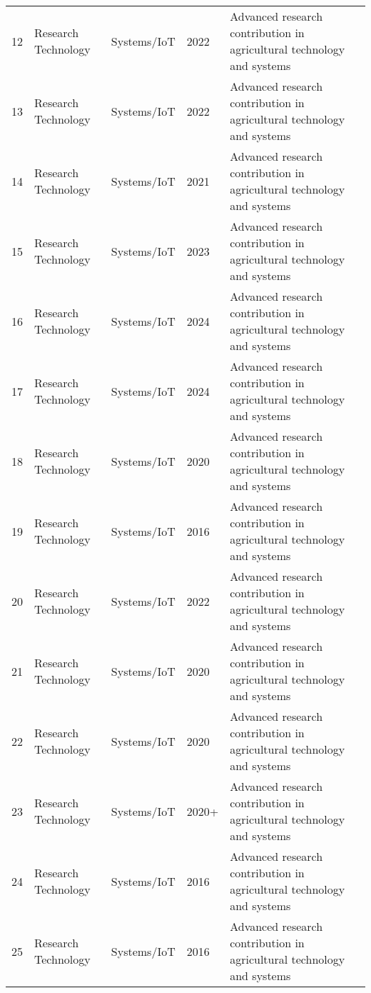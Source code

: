 \begin{table*}[htbp]
\begin{tabular}{p{}p{}p{}p{}p{}p{}}
 12 & Research Technology & Systems/IoT & 2022 & Advanced research contribution in agricultural technology and systems & \cite{Song2022} \\
 13 & Research Technology & Systems/IoT & 2022 & Advanced research contribution in agricultural technology and systems & \cite{sozzi2022automatic} \\
 14 & Research Technology & Systems/IoT & 2021 & Advanced research contribution in agricultural technology and systems & \cite{sumesh2021integration} \\
 15 & Research Technology & Systems/IoT & 2023 & Advanced research contribution in agricultural technology and systems & \cite{tang2023fruit} \\
 16 & Research Technology & Systems/IoT & 2024 & Advanced research contribution in agricultural technology and systems & \cite{Ting:2024_aej} \\
 17 & Research Technology & Systems/IoT & 2024 & Advanced research contribution in agricultural technology and systems & \cite{Ting:2024_ieee} \\
 18 & Research Technology & Systems/IoT & 2020 & Advanced research contribution in agricultural technology and systems & \cite{tu2020passion} \\
 19 & Research Technology & Systems/IoT & 2016 & Advanced research contribution in agricultural technology and systems & \cite{underwood2016mapping} \\
 20 & Research Technology & Systems/IoT & 2022 & Advanced research contribution in agricultural technology and systems & \cite{verbiest2022path} \\
 21 & Research Technology & Systems/IoT & 2020 & Advanced research contribution in agricultural technology and systems & \cite{visconti2020development} \\
 22 & Research Technology & Systems/IoT & 2020 & Advanced research contribution in agricultural technology and systems & \cite{wan2020faster} \\
 23 & Research Technology & Systems/IoT & 2020+ & Advanced research contribution in agricultural technology and systems & \cite{wang2013reconfigurable} \\
 24 & Research Technology & Systems/IoT & 2016 & Advanced research contribution in agricultural technology and systems & \cite{wang2016design} \\
 25 & Research Technology & Systems/IoT & 2016 & Advanced research contribution in agricultural technology and systems & \cite{wang2016localisation} \\

\end{tabular}
\end{table*}
